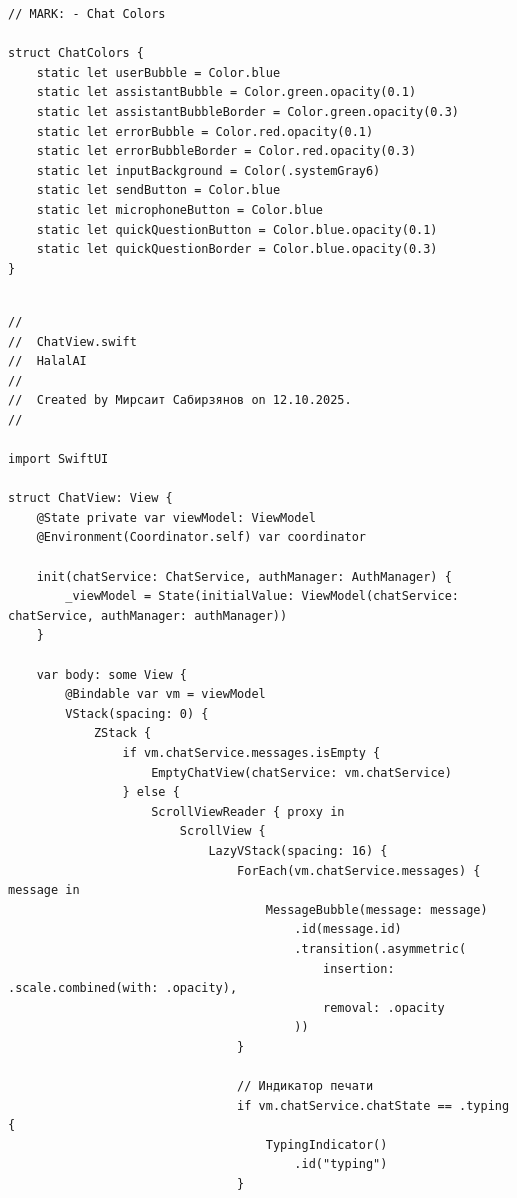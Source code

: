 \begin{lstlisting}[basicstyle=\tiny\ttfamily,breaklines=true]
// MARK: - Chat Colors

struct ChatColors {
    static let userBubble = Color.blue
    static let assistantBubble = Color.green.opacity(0.1)
    static let assistantBubbleBorder = Color.green.opacity(0.3)
    static let errorBubble = Color.red.opacity(0.1)
    static let errorBubbleBorder = Color.red.opacity(0.3)
    static let inputBackground = Color(.systemGray6)
    static let sendButton = Color.blue
    static let microphoneButton = Color.blue
    static let quickQuestionButton = Color.blue.opacity(0.1)
    static let quickQuestionBorder = Color.blue.opacity(0.3)
}
\end{lstlisting}

\begin{lstlisting}[basicstyle=\tiny\ttfamily,breaklines=true]

//
//  ChatView.swift
//  HalalAI
//
//  Created by Мирсаит Сабирзянов on 12.10.2025.
//

import SwiftUI

struct ChatView: View {
    @State private var viewModel: ViewModel
    @Environment(Coordinator.self) var coordinator

    init(chatService: ChatService, authManager: AuthManager) {
        _viewModel = State(initialValue: ViewModel(chatService: chatService, authManager: authManager))
    }
    
    var body: some View {
        @Bindable var vm = viewModel
        VStack(spacing: 0) {
            ZStack {
                if vm.chatService.messages.isEmpty {
                    EmptyChatView(chatService: vm.chatService)
                } else {
                    ScrollViewReader { proxy in
                        ScrollView {
                            LazyVStack(spacing: 16) {
                                ForEach(vm.chatService.messages) { message in
                                    MessageBubble(message: message)
                                        .id(message.id)
                                        .transition(.asymmetric(
                                            insertion: .scale.combined(with: .opacity),
                                            removal: .opacity
                                        ))
                                }
                                
                                // Индикатор печати
                                if vm.chatService.chatState == .typing {
                                    TypingIndicator()
                                        .id("typing")
                                }
                                

\end{lstlisting}
